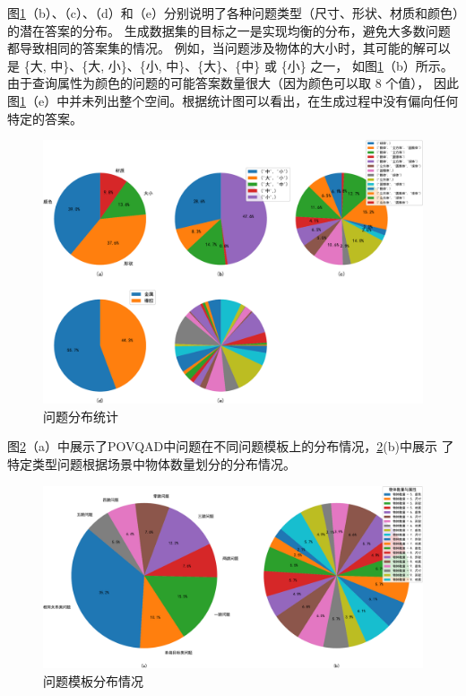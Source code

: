 图\ref{fig:question_statistics}（b）、（c）、（d）和（e）分别说明了各种问题类型（尺寸、形状、材质和颜色）的潜在答案的分布。
生成数据集的目标之一是实现均衡的分布，避免大多数问题都导致相同的答案集的情况。
例如，当问题涉及物体的大小时，其可能的解可以是
 \{大, 中\}、\{大, 小\}、\{小, 中\}、\{大\}、\{中\} 或 \{小\} 之一，
 如图\ref{fig:question_statistics}（b）所示。由于查询属性为颜色的问题的可能答案数量很大（因为颜色可以取 8 个值），
 因此图\ref{fig:question_statistics}（e）中并未列出整个空间。根据统计图可以看出，在生成过程中没有偏向任何特定的答案。
\begin{figure}[h]
    \centering
    \includegraphics[scale=0.45]{figures/question_distribution-crop.pdf}
    \caption{问题分布统计}
    \label{fig:question_statistics}
\end{figure}

图\ref{fig:template_statistics}（a）中展示了POVQAD中问题在不同问题模板上的分布情况，\ref{fig:template_statistics}(b)中展示
了特定类型问题根据场景中物体数量划分的分布情况。
\begin{figure}[h]
    \centering
    \includegraphics[scale=0.45]{figures/question_template_distribution-crop.pdf}
    \caption{问题模板分布情况}
    \label{fig:template_statistics}
\end{figure}
